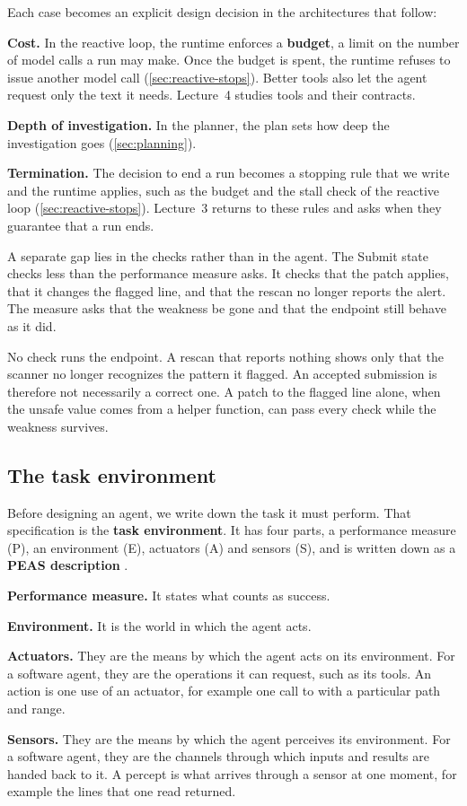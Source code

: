 Each case becomes an explicit design decision in the architectures that follow:
\bi
\item \textbf{Cost.} In the reactive loop, the runtime enforces a \textbf{budget}, a limit on the
number of model calls a run may make. Once the budget is spent, the runtime refuses to issue
another model call (\cref{sec:reactive-stops}). Better tools also let the agent request only the
text it needs. Lecture~4 studies tools and their contracts.
\item \textbf{Depth of investigation.} In the planner, the plan sets how deep the investigation
goes (\cref{sec:planning}).
\item \textbf{Termination.} The decision to end a run becomes a stopping rule that we write and the
runtime applies, such as the budget and the stall check of the reactive loop
(\cref{sec:reactive-stops}). Lecture~3 returns to these rules and asks when they guarantee that a
run ends.
\ei

A separate gap lies in the checks rather than in the agent. The Submit state checks less than the
performance measure asks. It checks that the patch applies, that it changes the flagged line, and
that the rescan no longer reports the alert. The measure asks that the weakness be gone and that
the endpoint still behave as it did.

No check runs the endpoint. A rescan that reports nothing shows only that the scanner no longer
recognizes the pattern it flagged. An accepted submission is therefore not necessarily a correct
one. A patch to the flagged line alone, when the unsafe value comes from a helper function, can pass
every check while the weakness survives.

\subsection{The task environment}
\label{sec:agents-environment}

Before designing an agent, we write down the task it must perform. That specification is the
\textbf{task environment}. It has four parts, a performance measure (P), an environment (E),
actuators (A) and sensors (S), and is written down as a \textbf{PEAS description}
\citep[\S2.3.1]{russell2020aima}.
\bi
\item \textbf{Performance measure.} It states what counts as success.
\item \textbf{Environment.} It is the world in which the agent acts.
\item \textbf{Actuators.} They are the means by which the agent acts on its environment. For a
software agent, they are the operations it can request, such as its tools. An action is one use of
an actuator, for example one call to  with a particular path and range.
\item \textbf{Sensors.} They are the means by which the agent perceives its environment. For a
software agent, they are the channels through which inputs and results are handed back to it. A
percept is what arrives through a sensor at one moment, for example the lines that one read
returned.
\ei


